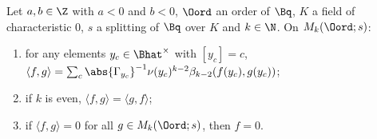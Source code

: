 Let $a,b\in\Z$ with $a<0$ and $b<0$, $\Oord$ an order of $\Bq$, $K$ a field of characteristic $0$, $s$ a splitting of $\Bq$ over $K$ and
$k\in\N$. On $M_k(\Oord;s)$:
\begin{enumerate}[label=(\alph*)]
\item for any elements $y_c\in\Bhat^\times$ with $[y_c]=c$, $\langle f,g\rangle=\sum_c\abs{\Gamma_{y_c}}^{-1}\nu(y_c)^{k-2}\beta_{k-2}(f(y_c),g(y_c))$;
\item if $k$ is even, $\langle f,g\rangle=\langle g,f\rangle$;
\item if $\langle f,g\rangle=0$ for all $g\in M_k(\Oord;s)$, then $f=0$.
\end{enumerate}
